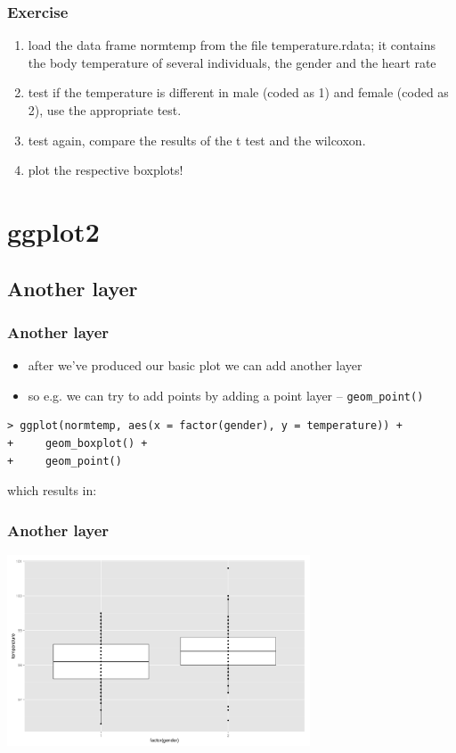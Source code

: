 \documentclass[xcolor={table}]{beamer}
\begin{document}
\begin{frame}\frametitle{Exercise}
  \begin{enumerate}
  \item load the data frame normtemp from the file temperature.rdata; it contains the body temperature of several individuals, the gender and the heart rate
  \item test if the temperature is different in male (coded as 1) and female (coded as 2), use the appropriate test.
  \item test again, compare the results of the t test and the wilcoxon.
  \item plot the respective boxplots!
  \end{enumerate}
\end{frame}

\section{ggplot2}
\subsection{Another layer}
\begin{frame}[fragile]\frametitle{Another layer}
  \begin{itemize}
  \item after we've produced our basic plot we can add another layer
  \item so e.g. we can try to add points by adding a point layer -- \texttt{geom\_point()}
  \end{itemize}\small
\begin{verbatim}
> ggplot(normtemp, aes(x = factor(gender), y = temperature)) +
+     geom_boxplot() +
+     geom_point()  
\end{verbatim}
which results in:
\end{frame}

\begin{frame}\frametitle{Another layer}
  \begin{center}
    \includegraphics[width=9cm]{boxplotpoint.png}
  \end{center}
\end{frame}
\end{document}
